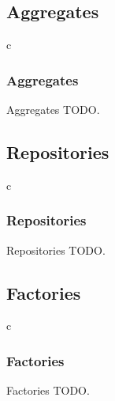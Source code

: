 \documentclass[a4paper,slidestop,xcolor=pst,dvips,blue]{beamer}
\begin{document}
\subsection{Aggregates}

\begin{frame}{c}
    \frametitle{Aggregates}
    \begin{block}{Aggregates}
    TODO.
    \end{block}
\end{frame}

\subsection{Repositories}

\begin{frame}{c}
    \frametitle{Repositories}
    \begin{block}{Repositories}
    TODO.
    \end{block}
\end{frame}

\subsection{Factories}

\begin{frame}{c}
    \frametitle{Factories}
    \begin{block}{Factories}
    TODO.
    \end{block}
\end{frame}

%

%
%	
%    
\end{document}

